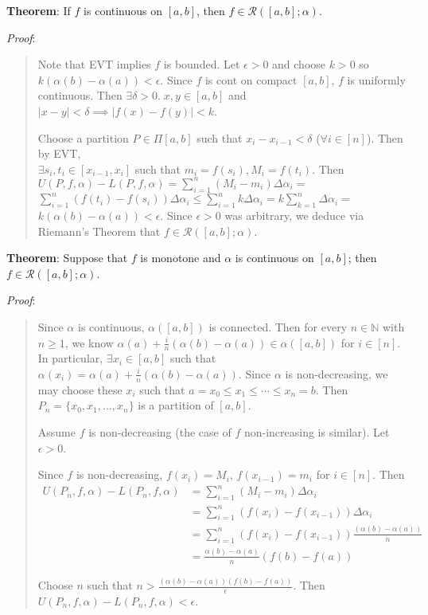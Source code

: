 \documentclass[11pt]{article}
\begin{document}
\textbf{Theorem}: If $f$ is continuous on $[a,b]$, then $f \in \mathcal{R}([a,b]; \alpha)$.

\emph{Proof}:
\begin{quote}\vspace{-0.3cm}
Note that EVT implies $f$ is bounded. Let $\epsilon > 0$ and choose $k > 0$ so $k(\alpha(b) - \alpha(a)) < \epsilon$. Since $f$ is cont on compact $[a,b]$, $f$ is uniformly continuous. Then $\exists \delta > 0.\; x,y \in [a,b]$ and $|x-y| < \delta \implies |f(x) - f(y)| < k$.

Choose a partition $P \in \Pi[a,b]$ such that $x_i - x_{i-1} < \delta$ ($\forall i \in [n]$). Then by EVT,\\ $\exists s_i, t_i \in [x_{i-1}, x_i]$ such that $m_i = f(s_i), M_i = f(t_i)$. Then $U(P, f, \alpha) - L(P, f, \alpha) = \sum_{i=1}^n (M_i - m_i) \Delta \alpha_i =$ $\sum_{i=1}^n (f(t_i) - f(s_i)) \Delta \alpha_i \leq \sum_{i=1}^n k \Delta \alpha_i = k \sum_{k=1}^n \Delta \alpha_i =$\\ $k (\alpha(b) - \alpha(a)) < \epsilon$. Since $\epsilon > 0$ was arbitrary, we deduce via Riemann's Theorem that $f \in \mathcal{R}([a,b]; \alpha)$.
\end{quote}

\textbf{Theorem}: Suppose that $f$ is monotone and $\alpha$ is continuous on $[a,b]$; then $f \in \mathcal{R}([a,b]; \alpha)$.

\emph{Proof}:
\begin{quote}
Since $\alpha$ is continuous, $\alpha([a,b])$ is connected. Then for every $n \in \mathbb{N}$ with $n \geq 1$, we know $\alpha(a) + \frac{i}{n}(\alpha(b) - \alpha(a)) \in \alpha([a,b])$ for $i \in [n]$. In particular, $\exists x_i \in [a,b]$ such that $\alpha(x_i) = \alpha(a) + \frac{i}{n} (\alpha(b) - \alpha(a))$. Since $\alpha$ is non-decreasing, we may choose these $x_i$ such that $a = x_0 \leq x_1 \leq \cdots \leq x_n = b$. Then $P_n = \{x_0, x_1, \ldots, x_n\}$ is a partition of $[a,b]$.

Assume $f$ is non-decreasing (the case of $f$ non-increasing is similar). Let $\epsilon > 0$.

Since $f$ is non-decreasing, $f(x_i) = M_i$, $f(x_{i-1}) = m_i$ for $i \in [n]$. Then
\begin{align*}
U(P_n, f, \alpha) - L(P_n, f, \alpha) &= \sum_{i=1}^n (M_i - m_i) \Delta \alpha_i\\
&= \sum_{i=1}^n (f(x_i) - f(x_{i-1})) \Delta \alpha_i\\
&= \sum_{i=1}^n (f(x_i) - f(x_{i-1})) \frac{(\alpha(b) - \alpha(a))}{n}\\
&= \frac{\alpha(b) - \alpha(a)}{n} (f(b) - f(a))
\end{align*}

Choose $n$ such that $n > \frac{(\alpha(b) - \alpha(a))(f(b) - f(a))}{\epsilon}$. Then $U(P_n, f, \alpha) - L(P_n, f, \alpha) < \epsilon$.
\end{quote}
\end{document}
